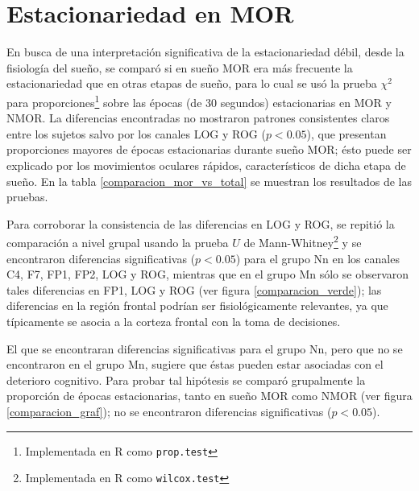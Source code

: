 \section{Estacionariedad en MOR}

En busca de una interpretación significativa de la estacionariedad débil, desde la fisiología del
sueño, se comparó si en sueño MOR era más frecuente la estacionariedad que en otras etapas de 
sueño, para lo cual se usó la prueba $\chi^{2}$ para proporciones\footnote{Implementada en R como 
\texttt{prop.test}} sobre las épocas (de 30 segundos) estacionarias en MOR y NMOR.
%
La diferencias encontradas no mostraron patrones consistentes claros entre los sujetos salvo por 
los canales LOG y ROG ($p<0.05$), que presentan proporciones mayores de épocas estacionarias 
durante sueño MOR; ésto puede ser explicado por los movimientos oculares rápidos, característicos 
de dicha etapa de sueño.
%
En la tabla \ref{comparacion_mor_vs_total} se muestran los resultados de las pruebas.

Para corroborar la consistencia de las diferencias en LOG y ROG, se repitió la comparación a nivel 
grupal usando la prueba $U$ de  Mann-Whitney\footnote{Implementada en R como \texttt{wilcox.test}}
y se encontraron diferencias significativas ($p<0.05$) para el grupo Nn en los canales C4, F7, FP1, 
FP2, LOG y ROG, mientras que en el grupo Mn sólo se observaron tales diferencias en FP1, LOG y ROG 
(ver figura \ref{comparacion_verde});
las diferencias en la región frontal podrían ser fisiológicamente relevantes, ya que típicamente se 
asocia a la corteza frontal con la toma de decisiones.

El que se encontraran diferencias significativas para el grupo Nn, pero que no se encontraron en el
grupo Mn, sugiere que éstas pueden estar asociadas con el deterioro cognitivo.
Para probar tal hipótesis se comparó grupalmente la proporción de épocas estacionarias, tanto en
sueño MOR como NMOR (ver figura \ref{comparacion_graf}); no se encontraron diferencias
significativas ($p<0.05$).

